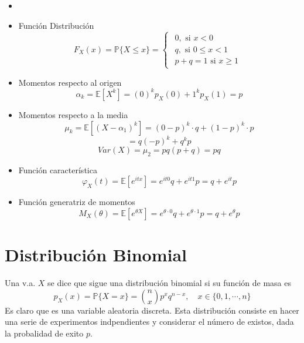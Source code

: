 \begin{prop}
  \begin{itemize}
    \item []
    \item Función Distribución
      \[ 
        F_{X}(x) = \mathbb{P} \{ X \leq x \} =
        \begin{cases}
          \begin{aligned}
            0, \text{ si } x < 0 \\
            q, \text{ si } 0 \leq x < 1 \\
            p + q = 1 \text{ si } x \geq 1
          \end{aligned}
        \end{cases} 
      \] 
    \item Momentos respecto al origen
      \[ 
        \alpha_{k} = \mathbb{E} [ X^{k} ] = (0)^{k} p_{X}(0) + 1^{k} p_{X}(1) = p 
      \] 
    \item Momentos respecto a la media
      \[ 
        \mu_{k} = \mathbb{E} [ (X - \alpha_{1})^{k} ] = (0 - p)^{k} \cdot q + (1 - p)^{k} \cdot p
      \] 
      \[ 
        = q (-p)^{k} + q^{k} p
      \] 
      \[ 
        Var (X) = \mu_{2} = pq(p + q) = pq
      \] 
    \item Función característica
      \[ 
        \varphi_{X}(t) = \mathbb{E} [ e^{itx} ] = e^{it0}q + e^{it1} p = q + e^{it} p
      \] 
    \item Función generatriz de momentos
      \[ 
        M_{X}(\theta) = \mathbb{E} [ e^{\theta X} ] = e^{\theta \cdot 0} q + e^{\theta \cdot 1} p = q + e^{\theta} p 
      \] 
  \end{itemize}
\end{prop}

\section{Distribución Binomial}

\begin{defn}
  Una v.a. $X$ se dice que sigue una distribución binomial si su función de masa es
  \[ 
    p_{X}(x) = \mathbb{P} \{ X = x \} = \binom{n}{x} p^{x} q^{n -x}, \quad x \in \{ 0, 1, \cdots, n \}
  \]
  Es claro que es una variable aleatoria discreta. Esta distribución consiste en hacer una serie de experimentos indpendientes y considerar el número de existos, dada la probalidad de exito $p$.
\end{defn}

